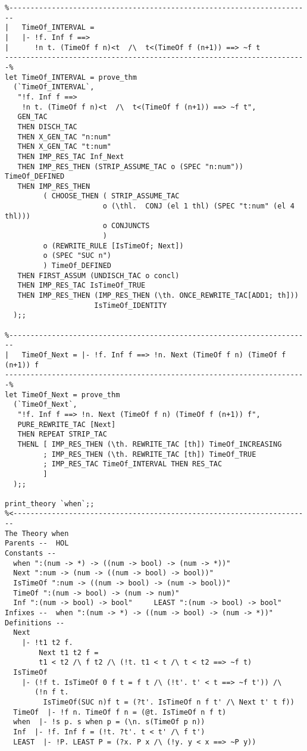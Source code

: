 \begin{verbatim}
%-----------------------------------------------------------------------
|   TimeOf_INTERVAL =
|   |- !f. Inf f ==> 
|      !n t. (TimeOf f n)<t  /\  t<(TimeOf f (n+1)) ==> ~f t
-----------------------------------------------------------------------%
let TimeOf_INTERVAL = prove_thm
  (`TimeOf_INTERVAL`,
   "!f. Inf f ==> 
    !n t. (TimeOf f n)<t  /\  t<(TimeOf f (n+1)) ==> ~f t",
   GEN_TAC
   THEN DISCH_TAC
   THEN X_GEN_TAC "n:num"
   THEN X_GEN_TAC "t:num"
   THEN IMP_RES_TAC Inf_Next
   THEN IMP_RES_THEN (STRIP_ASSUME_TAC o (SPEC "n:num")) TimeOf_DEFINED
   THEN IMP_RES_THEN
         ( CHOOSE_THEN ( STRIP_ASSUME_TAC
                       o (\thl.  CONJ (el 1 thl) (SPEC "t:num" (el 4 thl)))
                       o CONJUNCTS
                       )
         o (REWRITE_RULE [IsTimeOf; Next])
         o (SPEC "SUC n")
         ) TimeOf_DEFINED
   THEN FIRST_ASSUM (UNDISCH_TAC o concl)
   THEN IMP_RES_TAC IsTimeOf_TRUE
   THEN IMP_RES_THEN (IMP_RES_THEN (\th. ONCE_REWRITE_TAC[ADD1; th]))
                     IsTimeOf_IDENTITY
  );;

%-----------------------------------------------------------------------
|   TimeOf_Next = |- !f. Inf f ==> !n. Next (TimeOf f n) (TimeOf f (n+1)) f
-----------------------------------------------------------------------%
let TimeOf_Next = prove_thm
  (`TimeOf_Next`,
   "!f. Inf f ==> !n. Next (TimeOf f n) (TimeOf f (n+1)) f",
   PURE_REWRITE_TAC [Next]
   THEN REPEAT STRIP_TAC
   THENL [ IMP_RES_THEN (\th. REWRITE_TAC [th]) TimeOf_INCREASING
         ; IMP_RES_THEN (\th. REWRITE_TAC [th]) TimeOf_TRUE
         ; IMP_RES_TAC TimeOf_INTERVAL THEN RES_TAC
         ]
  );;

print_theory `when`;;
%<----------------------------------------------------------------------
The Theory when
Parents --  HOL     
Constants --
  when ":(num -> *) -> ((num -> bool) -> (num -> *))"
  Next ":num -> (num -> ((num -> bool) -> bool))"
  IsTimeOf ":num -> ((num -> bool) -> (num -> bool))"
  TimeOf ":(num -> bool) -> (num -> num)"
  Inf ":(num -> bool) -> bool"     LEAST ":(num -> bool) -> bool"     
Infixes --  when ":(num -> *) -> ((num -> bool) -> (num -> *))"     
Definitions --
  Next
    |- !t1 t2 f.
        Next t1 t2 f =
        t1 < t2 /\ f t2 /\ (!t. t1 < t /\ t < t2 ==> ~f t)
  IsTimeOf
    |- (!f t. IsTimeOf 0 f t = f t /\ (!t'. t' < t ==> ~f t')) /\
       (!n f t.
         IsTimeOf(SUC n)f t = (?t'. IsTimeOf n f t' /\ Next t' t f))
  TimeOf  |- !f n. TimeOf f n = (@t. IsTimeOf n f t)
  when  |- !s p. s when p = (\n. s(TimeOf p n))
  Inf  |- !f. Inf f = (!t. ?t'. t < t' /\ f t')
  LEAST  |- !P. LEAST P = (?x. P x /\ (!y. y < x ==> ~P y))
  

\end{verbatim}
